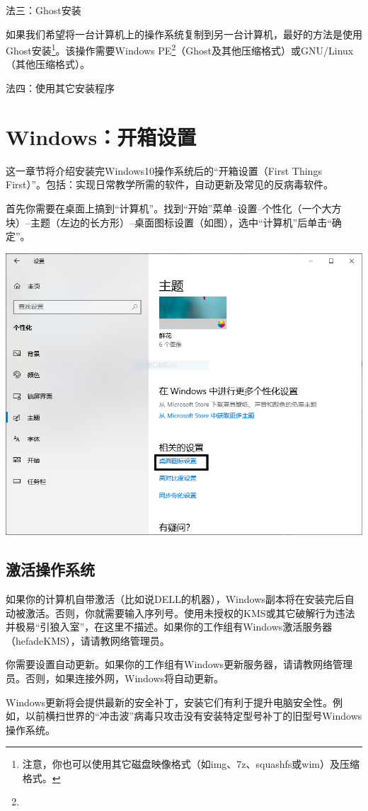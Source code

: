 \documentclass{book}
\begin{document}
法三：Ghost安装\par
如果我们希望将一台计算机上的操作系统复制到另一台计算机，最好的方法是使用Ghost安装\footnote{注意，你也可以使用其它磁盘映像格式（如img、7z、squashfs或wim）及压缩格式。}。该操作需要Windows PE\footnote{{\color{red}{警告！即使使用Microsoft提供的映像，部分PE系统会在安装系统时向计算机置入病毒程序或进行捆绑安装！}}}（Ghost及其他压缩格式）或GNU/Linux（其他压缩格式）。\par
法四：使用其它安装程序\par

\section{Windows：开箱设置}
这一章节将介绍安装完Windows10操作系统后的“开箱设置（First Things First）”。包括：实现日常教学所需的软件，自动更新及常见的反病毒软件。\par
首先你需要在桌面上搞到“计算机”。找到“开始”菜单--设置--个性化（一个大方块）--主题（左边的长方形）--桌面图标设置（如图），选中“计算机”后单击“确定”。
\begin{center}
	\includegraphics[scale=0.6]{pic/WinComp}
\end{center}
\subsection{激活操作系统}
如果你的计算机自带激活（比如说DELL的机器），Windows副本将在安装完后自动被激活。否则，你就需要输入序列号。使用未授权的KMS或其它破解行为违法并极易“引狼入室”，在这里不描述。如果你的工作组有Windows激活服务器（hefadeKMS），请请教网络管理员。\par
你需要设置自动更新。如果你的工作组有Windows更新服务器，请请教网络管理员。否则，如果连接外网，Windows将自动更新。\par
Windows更新将会提供最新的安全补丁，安装它们有利于提升电脑安全性。例如，以前横扫世界的“冲击波”病毒只攻击没有安装特定型号补丁的旧型号Windows操作系统。
\end{document}
